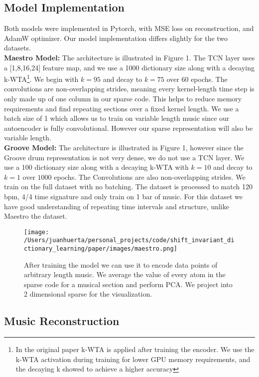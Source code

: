 \documentclass[11pt,a4paper]{article}
\begin{document}
\subsection{Model Implementation}
Both models were implemented in Pytorch, with MSE loss on reconstruction, and AdamW optimizer. Our model implementation differs slightly for the two datasets. 
 \\
\textbf{Maestro Model: } The architecture is illustrated in Figure 1. The TCN layer uses a [1,8,16,24] feature map, and we use a 1000 dictionary size along with a decaying k-WTA\footnote{In the original paper k-WTA is applied after training the encoder. We use the k-WTA activation during training for lower GPU memory requirements, and the decaying k showed to achieve a higher accuracy}. We begin with $k=95$ and decay to $k=75$ over $60$ epochs. The convolutions are non-overlapping strides, meaning every kernel-length time step is only made up of one column in our sparse code. This helps to reduce memory requirements and find repeating sections over a fixed kernel length. We use a batch size of 1 which allows us to train on variable length music since our autoencoder is fully convolutional. However our sparse representation will also be variable length. \\
\textbf{Groove Model: } The architecture is illustrated in Figure 1, however since the Groove drum representation is not very dense, we do not use a TCN layer. We use a 100 dictionary size along with a decaying k-WTA with $k=10$ and decay to $k=1$ over $1000$ epochs. The Convolutions are  also non-overlapping strides. We train on the full dataset with no batching. The dataset is processed to match 120 bpm, 4/4 time signature and only train on 1 bar of music.  For this dataset we have good understanding of repeating time intervals and structure, unlike Maestro the dataset. 


\begin{figure*}[ht]
  \texttt{[image: /Users/juanhuerta/personal\_projects/code/shift\_invariant\_dictionary\_learning/paper/images/maestro.png]}
  \caption{After training the model we can use it to encode data points of arbitrary length music. We average the value of every atom in the sparse code for a musical section and perform PCA. We project into 2 dimensional sparse for the visualization. }
  \label{fig:boat1}
\end{figure*}


\subsection{Music Reconstruction}
\label{ssec:first}
\end{document}
